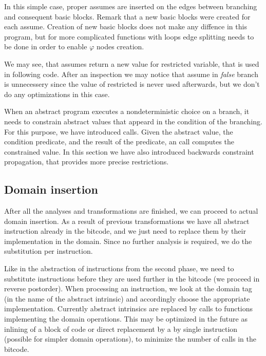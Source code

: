 \begin{example}
In this simple case, proper assumes are inserted on the edges between branching
and consequent basic blocks. Remark that a new basic blocks were created for each
assume. Creation of new basic blocks does not make any diffence in this
program, but for more complicated functions with loops edge splitting needs
to be done in order to enable $\varphi$ nodes creation.

We may see, that assumes return a new value for restricted variable, that is
used in following code. After an inspection we may notice that assume in
\emph{false} branch is unnecessery since the value of restricted
 is never used afterwards, but we don't do any
optimizations in this case.
\end{example}

\begin{summary}
When an abstract program executes a nondeterministic choice on a branch, it
needs to constrain abstract values that appeard in the condition of the
branching. For this purpose, we have introduced  calls. Given
the abstract value, the condition predicate, and the result of the
predicate, an  call computes the constrained value. In this
section we have also introduced backwards constraint propagation, that
provides more precise restrictions.
\end{summary}

\subsection{Domain insertion}

After all the analyses and transformations are finished, we can proceed to
actual domain insertion. As a result of previous transformations we have all
abstract instruction already in the bitcode, and we just need to replace them by
their implementation in the domain. Since no further analysis is required, we do
the substitution per instruction.

Like in the abstraction of instructions from the second phase, we need to
substitute instructions before they are used further in the bitcode (we proceed
in reverse postorder). When processing an instruction, we look at the domain tag
(in the name of the abstract intrinsic) and accordingly choose the appropriate
implementation. Currently abstract intrinsics are replaced by calls to functions
implementing the domain operations. This may be optimized in the future as
inlining of a block of code or direct replacement by a by single instruction
(possible for simpler domain operations), to minimize the number of calls in the
bitcode.

